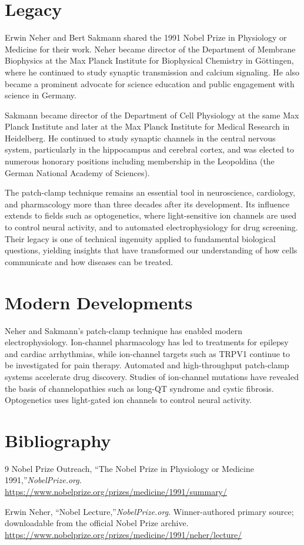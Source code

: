 \section{Legacy}

Erwin Neher and Bert Sakmann shared the 1991 Nobel Prize in Physiology or Medicine for their work. Neher became director of the Department of Membrane Biophysics at the Max Planck Institute for Biophysical Chemistry in G{\"o}ttingen, where he continued to study synaptic transmission and calcium signaling. He also became a prominent advocate for science education and public engagement with science in Germany.

Sakmann became director of the Department of Cell Physiology at the same Max Planck Institute and later at the Max Planck Institute for Medical Research in Heidelberg. He continued to study synaptic channels in the central nervous system, particularly in the hippocampus and cerebral cortex, and was elected to numerous honorary positions including membership in the Leopoldina (the German National Academy of Sciences).

The patch-clamp technique remains an essential tool in neuroscience, cardiology, and pharmacology more than three decades after its development. Its influence extends to fields such as optogenetics, where light-sensitive ion channels are used to control neural activity, and to automated electrophysiology for drug screening. Their legacy is one of technical ingenuity applied to fundamental biological questions, yielding insights that have transformed our understanding of how cells communicate and how diseases can be treated.


\section{Modern Developments}

Neher and Sakmann's patch-clamp technique has enabled modern electrophysiology. Ion-channel pharmacology has led to treatments for epilepsy and cardiac arrhythmias, while ion-channel targets such as TRPV1 continue to be investigated for pain therapy. Automated and high-throughput patch-clamp systems accelerate drug discovery. Studies of ion-channel mutations have revealed the basis of channelopathies such as long-QT syndrome and cystic fibrosis. Optogenetics uses light-gated ion channels to control neural activity.


\section{Bibliography}

\begin{thebibliography}{9}
Nobel Prize Outreach, ``The Nobel Prize in Physiology or Medicine 1991,''\emph{NobelPrize.org}.\\
\url{https://www.nobelprize.org/prizes/medicine/1991/summary/}

Erwin Neher, ``Nobel Lecture,''\emph{NobelPrize.org}. Winner-authored primary source; downloadable from the official Nobel Prize archive.\\
\url{https://www.nobelprize.org/prizes/medicine/1991/neher/lecture/}
\end{thebibliography}
